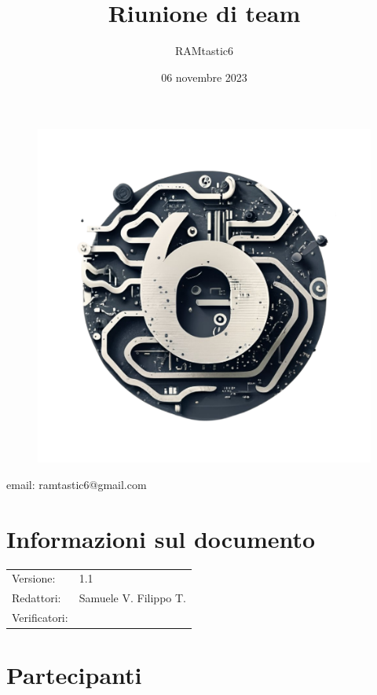 \documentclass[12pt, oneside]{article}
\author{RAMtastic6}
\begin{document}
\thispagestyle{empty}
\title{Riunione di team}
\date{06 novembre 2023} %

\maketitle
\begin{figure}[h]
	\centering
	\includegraphics[scale=0.3]{logo.png}
	\label{}
\end{figure}
\begin{center}
    email: ramtastic6@gmail.com
\end{center}

\section*{Informazioni sul documento}
\begin{tabular}{ll}
Versione: & 1.1 \\
Redattori: & Samuele V. Filippo T. \\
Verificatori: & 
\end{tabular}
\newpage

\tableofcontents
\newpage

\section{Partecipanti}
\end{document}
